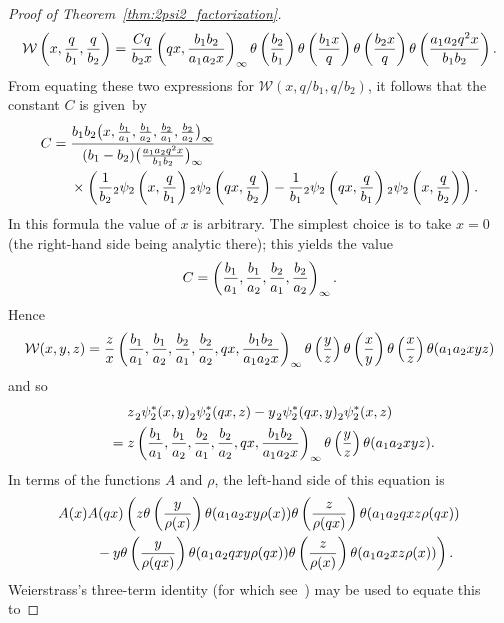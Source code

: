 \documentclass[pdftex]{sigma}
\numberwithin{equation}{section}
\renewcommand{\sp}{\hspace{0.5pt}}
\begin{document}
\begin{proof}[Proof of Theorem~\ref{thm:2psi2_factorization}]
\[ \mathcal{W}\left(x,{q \over b_1},{q \over b_2}\right) = {Cq \over b_2x} \left(qx,{b_1b_2 \over a_1a_2x}\right)_{ \infty} \theta\left({b_2 \over b_1} \right) \theta\left( {b_1x \over q} \right) \theta\left( {b_2x \over q} \right) \theta\left({a_1a_2q^2x \over b_1b_2}\right). \]
From equating these two expressions for $\mathcal{W}(x,q/b_1,q/b_2)$, it follows that the constant $C$ is given~by
\begin{align*}
 C = {}&{b_1b_2 \bigl(x,{b_1 \over a_1},{b_1 \over a_2},{b_2 \over a_1},{b_2 \over a_2}\bigr)_\infty \over (b_1-b_2) \bigl({a_1a_2q^2x \over b_1b_2}\bigr)_\infty}\\
 &\times\left( {1 \over b_2} {}_2\psi_2\left(x,{q \over b_1}\right) {}_2\psi_2\left(qx,{q \over b_2}\right) - {1 \over b_1} {}_2\psi_2\left(qx,{q \over b_1}\right){}_2\psi_2\left(x,{q \over b_2}\right) \right).
 \end{align*}
In this formula the value of $x$ is arbitrary. The simplest choice is to take $x=0$ (the right-hand side being analytic there); this yields the value
\[ C = \left({b_1 \over a_1},{b_1 \over a_2},{b_2 \over a_1},{b_2 \over a_2}\right)_{ \infty}. \]
Hence
\[ \mathcal{W}(x,y,z) = {z \over x} \left({b_1 \over a_1},{b_1 \over a_2},{b_2 \over a_1},{b_2 \over a_2},qx,{b_1b_2 \over a_1a_2x}\right)_{ \infty} \theta\left({y \over z} \right) \theta\left( {x \over y} \right) \theta\left( {x \over z} \right) \theta(a_1a_2xyz) \]
and so
\begin{gather}
z \sp {}_2^{}\psi_2^\ast(x,y) {}_2^{}\psi_2^\ast(qx,z) - y \sp {}_2^{}\psi_2^\ast(qx,y){}_2^{}\psi_2^\ast(x,z)\nonumber\\
\qquad = z \left({b_1 \over a_1},{b_1 \over a_2},{b_2 \over a_1},{b_2 \over a_2},qx,{b_1b_2 \over a_1a_2x}\right)_{ \infty} \theta\left({y \over z} \right) \theta(a_1a_2xyz). \label{eqn:2psi2_Wronskian_factorization}
\end{gather}
In terms of the functions $A$ and $\rho$, the left-hand side of this equation is
\begin{gather*}
A(x) A(qx) \left( z \theta\left({y \over \rho(x)}\right) \theta (a_1a_2xy\rho(x) ) \theta\left({z \over \rho(qx)}\right) \theta (a_1a_2qxz\rho(qx) )\right. \\
\left.\qquad{}- y \theta\left({y \over \rho(qx)}\right) \theta (a_1a_2qxy\rho(qx) ) \theta\left({z \over \rho(x)}\right) \theta (a_1a_2xz\rho(x) ) \right).
\end{gather*}
Weierstrass's three-term identity (for which see~\cite[Exercise~2.16\,(i)]{Gasper2004}) may be used to equate this to

\end{proof}
\end{document}
